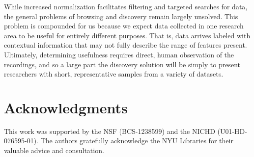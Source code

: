 \documentclass{sig-alternate}
\begin{document}
While increased normalization facilitates filtering and targeted searches for data, the general problems of browsing and discovery remain largely unsolved.
This problem is compounded for us because we expect data collected in one research area to be useful for entirely different purposes.
That is, data arrives labeled with contextual information that may not fully describe the range of features present.
Ultimately, determining usefulness requires direct, human observation of the recordings, and so a large part the discovery solution will be simply to present researchers with short, representative samples from a variety of datasets.

\section*{Acknowledgments}

This work was supported by the NSF (BCS-1238599) and the NICHD (U01-HD-076595-01).
The authors gratefully acknowledge the NYU Libraries for their valuable advice and consultation.



\end{document}
